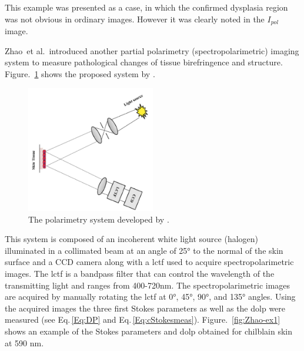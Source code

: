 This example was presented as a case, in which the confirmed dysplasia region was not obvious in ordinary images.
However it was clearly noted in the $I_{pol}$ image.

Zhao~et al.\,\cite{zhao2009} introduced another partial polarimetry (spectropolarimetric) imaging system to measure pathological changes of tissue birefringence and structure. 
Figure.~\ref{fig:Zhaosys} shows the proposed system by \cite{zhao2009}.
		\begin{figure}
		\centering
		\includegraphics[width = 0.5\textwidth]{Chapter4/Figures/spectropolarimeter.png}	
	\caption[Polarimetry system proposed by \cite{zhao2009}]{The polarimetry system developed by \cite{zhao2009}.}
		\label{fig:Zhaosys}
		\end{figure}	
\noindent This system is composed of an incoherent white light source (halogen) illuminated in a collimated beam at an angle of \ang{25} to the normal of the skin surface and a CCD camera along with a \ac{lctf} used to acquire spectropolarimetric images.
The \ac{lctf} is a bandpass filter that can control the wavelength of the transmitting light and ranges from 400-720\si{\nano\meter}.
The spectropolarimetric images are acquired by manually rotating the \ac{lctf} at \ang{0}, \ang{45}, \ang{90}, and \ang{135} angles.
Using the acquired images the three first Stokes parameters as well as the \ac{dolp} were measured (see Eq.\,\ref{Eq:DP} and Eq.\,\ref{Eq:cStokesmeas}). 
Figure.~\ref{fig:Zhao-ex1} shows an example of the Stokes parameters and \ac{dolp} obtained for chilblain skin at 590 \si{\nano\meter}.
